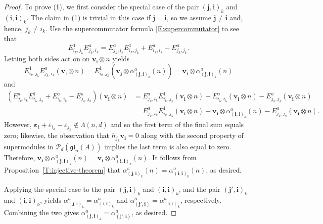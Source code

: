 \documentclass[10pt,a4paper]{amsart}
\newcommand{\Pol}{\mathcal{P}}
\newcommand{\bepsilon}{\boldsymbol{\varepsilon}}
\newcommand{\bi}{\mathbf{i}}
\newcommand{\bj}{\mathbf{j}}
\newcommand{\bv}{\mathbf{v}}
\newcommand{\gl}{\mathfrak{gl}}
\begin{document}
\begin{proof}
To prove (1), we first consider the special case of the pair $(\bj, \bi)_{k}$ and $(\bi, \bi)_{k}$.  The claim in (1) is trivial in this case if $\bj = \bi$, so we assume $\bj  \neq \bi$ and, hence, $j_{k} \neq i_{k}$. Use the  supercommutator formula \eqref{E:supercommutator}  to see that
\[
E_{i_{k}, j_{k}}^{1}E_{j_{k}, i_{k}}^{a} = E_{j_{k},i_{k}}^{a}E_{i_{k},j_{k}}^{1} + E_{i_{k},i_{k}}^{a} - E^{a}_{j_{k}, j_{k}}.
\]
Letting both sides act on on $\bv^{}_{\bi} \otimes n$ yields 
\[
E_{i_{k}, j_{k}}^{1}E_{j_{k}, i_{k}}^{a}(\bv^{}_{\bi} \otimes n) = E_{i_{k}, j_{k}}^{1}(\bv^{}_{\bj} \otimes \alpha^{a}_{(\bj , \bi)_{k}}(n))= \bv^{}_{\bi} \otimes \alpha^{a}_{(\bj , \bi)_{k}}(n)
\] and 
\begin{align*}
\left(E_{j_{k},i_{k}}^{a}E_{i_{k},j_{k}}^{1} + E_{i_{k},i_{k}}^{a} - E^{a}_{j_{k}, j_{k}} \right)(\bv^{}_{\bi} \otimes n) &= E_{j_{k},i_{k}}^{a}E_{i_{k},j_{k}}^{1}(\bv^{}_{\bi} \otimes n) + E_{i_{k},i_{k}}^{a}(\bv^{}_{\bi} \otimes n) - E^{a}_{j_{k}, j_{k}}(\bv^{}_{\bi} \otimes n) \\
&= E_{j_{k},i_{k}}^{a}E_{i_{k},j_{k}}^{1}(\bv^{}_{\bi} \otimes n) + \bv^{}_{\bi} \otimes \alpha^{a}_{(\bi, \bi)_{k}}(n) - E^{a}_{j_{k}, j_{k}}(\bv^{}_{\bi} \otimes n).
\end{align*}
However, $\bepsilon_{\bi} + \varepsilon_{i_{k}}-\varepsilon_{j_{k}} \not \in \Lambda(n,d)$ and so the first term of the final sum equals zero; likewise, the observation that $h_{j_{k}}\bv_{\bi}=0$ along with the second property of supermodules in $\Pol_{d}(\gl_{n}(A))$ implies the last term is also equal to zero.  Therefore, $\bv^{}_{\bi} \otimes \alpha^{a}_{(\bj , \bi)_{k}}(n) = \bv^{}_{\bi} \otimes \alpha^{a}_{(\bi, \bi)_{k}}(n)$.  It follows from Proposition~\ref{T:injective-theorem} that $\alpha^{a}_{(\bj , \bi)_{k}}(n) = \alpha^{a}_{(\bi, \bi)_{k}}(n)$, as desired.

Applying the special case to the pair $(\bj , \bi )_{k}$ and $(\bi,\bi)_{k}$, and the pair $(\bj' , \bi )_{k}$ and $(\bi,\bi)_{k}$, yields $\alpha^{a}_{(\bj , \bi)_{k}} = \alpha^{a}_{(\bi,\bi)_{k}}$ and $ \alpha^{a}_{(\bj', \bi)}= \alpha^{a}_{(\bi,\bi)_{k}}$, respectively.  Combining the two gives  $\alpha^{a}_{(\bj , \bi)_{k}}  = \alpha^{a}_{(\bj', \bi)}$, as desired.



\end{proof}
\end{document}
